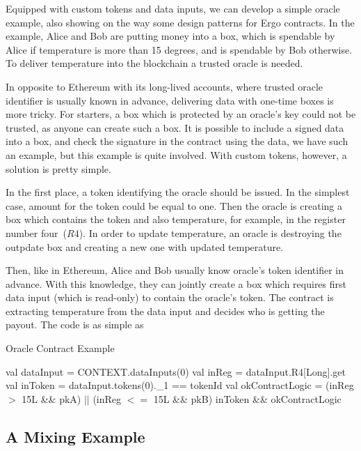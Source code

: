  Equipped with custom tokens and data inputs, we can develop a simple oracle example, also showing on the way some
 design patterns for Ergo contracts. In the example, Alice and Bob are putting money into a box, which is spendable by
 Alice if temperature is more than 15 degrees, and is spendable by Bob otherwise. To deliver temperature into the
 blockchain a trusted oracle is needed.

 In opposite to Ethereum with its long-lived accounts, where trusted oracle identifier is usually known in advance,
 delivering data with one-time boxes is more tricky. For starters, a box which is protected by an oracle's key could
 not be trusted, as anyone can create such a box. It is possible to include a signed data into a box, and check the
 signature in the contract using the data, we have such an example, but this example is quite involved. With custom
 tokens, however, a solution is pretty simple.

 In the first place, a token identifying the oracle should be issued. In the simplest case, amount for the token could
 be equal to one. Then the oracle is creating a box which contains the token and also temperature, for example, in the
 register number four~($R4$). In order to update temperature, an oracle is destroying the outpdate box and creating a
 new one with updated temperature.

 Then, like in Ethereum, Alice and Bob usually know oracle's token identifier in advance. With this knowledge, they
 can jointly create a box which requires first data input (which is read-only) to contain the oracle's token. The
 contract is extracting temperature from the data input and decides who is getting the payout. The code is as simple as


 \begin{algorithm}[H]
    \caption{Oracle Contract Example}
    \label{alg:oracle}
    \begin{algorithmic}[1]
        \State val dataInput = CONTEXT.dataInputs(0)
        \State val inReg = dataInput.R4[Long].get
        \State val inToken = dataInput.tokens(0).\_1 == tokenId
        \State val okContractLogic = (inReg $>$ 15L \&\& pkA) $||$ (inReg $<=$ 15L \&\& pkB)
        \State inToken \&\& okContractLogic
    \end{algorithmic}
 \end{algorithm}

\subsection{A Mixing Example}
 \label{sec:platform}

